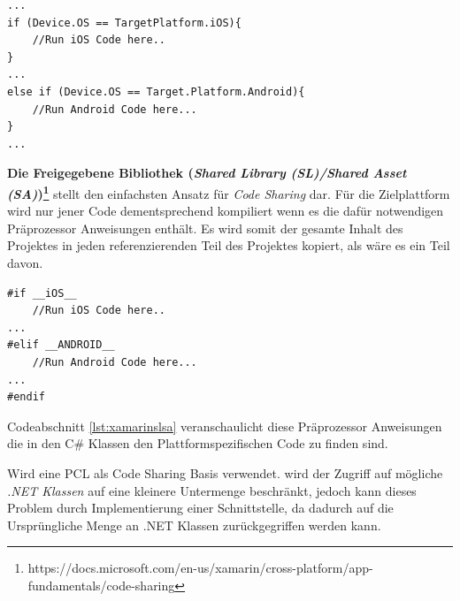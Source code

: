 	\begin{lstlisting}[caption={Plattform spezifischen Code in PCL ausführen},label={lst:xamarinpcl},captionpos=b,style=JAVA-Own]
...
if (Device.OS == TargetPlatform.iOS){
	//Run iOS Code here..
}
...
else if (Device.OS == Target.Platform.Android){
	//Run Android Code here...
}
...
	\end{lstlisting}

	\textbf{Die Freigegebene Bibliothek (\textit{Shared Library (SL)/Shared Asset (SA)})\footnote{https://docs.microsoft.com/en-us/xamarin/cross-platform/app-fundamentals/code-sharing}} stellt den einfachsten Ansatz für \textit{Code Sharing} dar. Für die Zielplattform wird nur jener Code dementsprechend kompiliert wenn es die dafür notwendigen Präprozessor Anweisungen enthält. Es wird somit der gesamte Inhalt des Projektes in jeden referenzierenden Teil des Projektes kopiert, als wäre es ein Teil davon.\\

	\begin{lstlisting}[caption={Plattform spezifischen Code in SA/SL ausführen},label={lst:xamarinslsa},captionpos=b,style=JAVA-Own]
#if __iOS__
	//Run iOS Code here..
...
#elif __ANDROID__
	//Run Android Code here...
...
#endif
	\end{lstlisting}

	Codeabschnitt \ref{lst:xamarinslsa} veranschaulicht diese Präprozessor Anweisungen die in den C\# Klassen den Plattformspezifischen Code zu finden sind.

	Wird eine PCL als Code Sharing Basis verwendet. wird der Zugriff auf mögliche \textit{.NET Klassen} auf eine kleinere Untermenge beschränkt, jedoch kann dieses Problem durch Implementierung einer Schnittstelle, da dadurch auf die Ursprüngliche Menge an .NET Klassen zurückgegriffen werden kann.



















